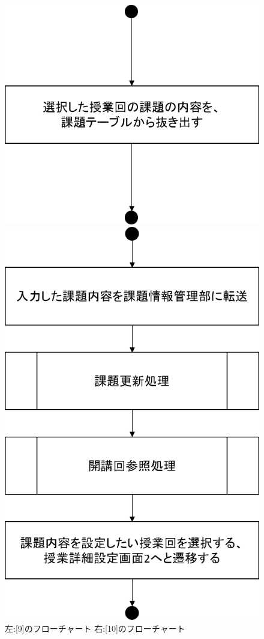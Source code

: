 \begin{figure}[htbp]
 \begin{minipage}{0.5\hsize}
  \begin{center}
   \includegraphics[width=0.45\linewidth,clip]{./img/takeover_lecture/sub9.png}
  \end{center}
 \end{minipage}
 \begin{minipage}{0.5\hsize}
  \begin{center}
   \includegraphics[width=0.45\linewidth,clip]{./img/takeover_lecture/sub10.png}
  \end{center}
 \end{minipage}
 \caption{左:[9]のフローチャート 右:[10]のフローチャート}\label{fig:takeoverlectureflow4}
\end{figure}


